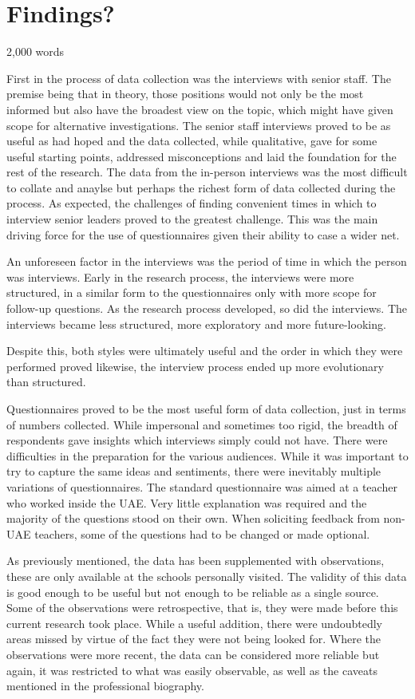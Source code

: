 \section{Findings?}
2,000 words 

First in the process of data collection was the interviews with senior staff. The premise being that in theory, those positions would not only be the most informed but also have the broadest view on the topic, which might have given scope for alternative investigations. The senior staff interviews proved to be as useful as had hoped and the data collected, while qualitative, gave for some useful starting points, addressed misconceptions and laid the foundation for the rest of the research. The data from the in-person interviews was the most difficult to collate and anaylse but perhaps the richest form of data collected during the process. As expected, the challenges of finding convenient times in which to interview senior leaders proved to the greatest challenge. This was the main driving force for the use of questionnaires given their ability to case a wider net. 

An unforeseen factor in the interviews was the period of time in which the person was interviews. Early in the research process, the interviews were more structured, in a similar form to the questionnaires only with more scope for follow-up questions. As the research process developed, so did the interviews. The interviews became less structured, more exploratory and more future-looking.

Despite this, both styles were ultimately useful and the order in which they were performed proved likewise, the interview process ended up more evolutionary than structured.

Questionnaires proved to be the most useful form of data collection, just in terms of numbers collected. While impersonal and sometimes too rigid, the breadth of respondents gave insights which interviews simply could not have. There were difficulties in the preparation for the various audiences. While it was important to try to capture the same ideas and sentiments, there were inevitably multiple variations of questionnaires. The standard questionnaire was aimed at a teacher who worked inside the UAE. Very little explanation was required and the majority of the questions stood on their own. When soliciting feedback from non-UAE teachers, some of the questions had to be changed or made optional. 

As previously mentioned, the data has been supplemented with observations, these are only available at the schools personally visited. The validity of this data is good enough to be useful but not enough to be reliable as a single source. Some of the observations were retrospective, that is, they were made before this current research took place. While a useful addition, there were undoubtedly areas missed by virtue of the fact they were not being looked for. Where the observations were more recent, the data can be considered more reliable but again, it was restricted to what was easily observable, as well as the caveats mentioned in the professional biography.

